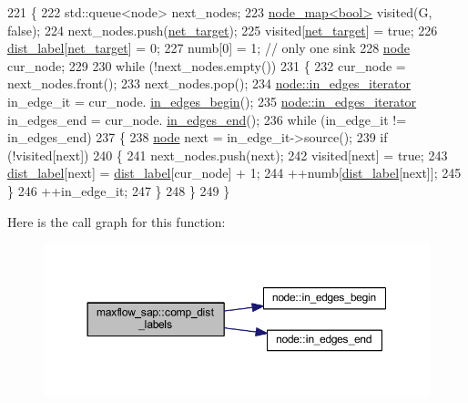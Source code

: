 \begin{DoxyCode}
221 \{
222     std::queue<node> next\_nodes;
223     \mbox{\hyperlink{classnode__map}{node\_map<bool>}} visited(G, \textcolor{keyword}{false});
224     next\_nodes.push(\mbox{\hyperlink{classmaxflow__sap_a8d0e8f448ed29a1329a70c8f4f496c2c}{net\_target}});
225     visited[\mbox{\hyperlink{classmaxflow__sap_a8d0e8f448ed29a1329a70c8f4f496c2c}{net\_target}}] = \textcolor{keyword}{true};
226     \mbox{\hyperlink{classmaxflow__sap_a14eef09823ae0ac69348c2b3a60e6ca3}{dist\_label}}[\mbox{\hyperlink{classmaxflow__sap_a8d0e8f448ed29a1329a70c8f4f496c2c}{net\_target}}] = 0;
227     numb[0] = 1;    \textcolor{comment}{// only one sink}
228     \mbox{\hyperlink{classnode}{node}} cur\_node;
229 
230     \textcolor{keywordflow}{while} (!next\_nodes.empty())
231     \{
232         cur\_node = next\_nodes.front();
233         next\_nodes.pop();
234         \mbox{\hyperlink{classnode_a9a96be92add7c1a2771bcd0431ebf8ab}{node::in\_edges\_iterator}} in\_edge\_it = cur\_node.
      \mbox{\hyperlink{classnode_a0c32377f370ae52ed2134ff8d4dac584}{in\_edges\_begin}}();
235         \mbox{\hyperlink{classnode_a9a96be92add7c1a2771bcd0431ebf8ab}{node::in\_edges\_iterator}} in\_edges\_end = cur\_node.
      \mbox{\hyperlink{classnode_a785cd330f8b4c5c47d3b6e936a7e744e}{in\_edges\_end}}();
236         \textcolor{keywordflow}{while} (in\_edge\_it != in\_edges\_end)
237         \{
238             \mbox{\hyperlink{classnode}{node}} next = in\_edge\_it->source();
239             \textcolor{keywordflow}{if} (!visited[next])
240             \{
241                 next\_nodes.push(next);
242                 visited[next] = \textcolor{keyword}{true};
243                 \mbox{\hyperlink{classmaxflow__sap_a14eef09823ae0ac69348c2b3a60e6ca3}{dist\_label}}[next] = \mbox{\hyperlink{classmaxflow__sap_a14eef09823ae0ac69348c2b3a60e6ca3}{dist\_label}}[cur\_node] + 1;
244                 ++numb[\mbox{\hyperlink{classmaxflow__sap_a14eef09823ae0ac69348c2b3a60e6ca3}{dist\_label}}[next]];
245             \}
246             ++in\_edge\_it;
247         \}
248     \}
249 \}
\end{DoxyCode}
Here is the call graph for this function\+:\nopagebreak
\begin{figure}[H]
\begin{center}
\leavevmode
\includegraphics[width=350pt]{classmaxflow__sap_ab9a8d9e4e32a8eb6390c0d2fb3cb9596_cgraph}
\end{center}
\end{figure}
